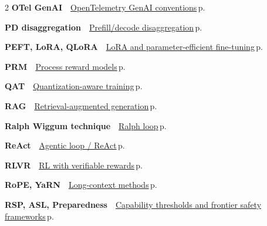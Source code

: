 \documentclass[10pt,a4paper,openany]{report}
\begin{document}
\begin{multicols}{2}
\textbf{\sffamily\color{accent}OTel GenAI}\ \ \hyperref[c:protocols-11]{OpenTelemetry GenAI conventions}\,{\color{muted}\scriptsize p.\,\pageref{c:protocols-11}}\par\vspace{2pt}
\textbf{\sffamily\color{accent}PD disaggregation}\ \ \hyperref[c:inference-3]{Prefill/decode disaggregation}\,{\color{muted}\scriptsize p.\,\pageref{c:inference-3}}\par\vspace{2pt}
\textbf{\sffamily\color{accent}PEFT, LoRA, QLoRA}\ \ \hyperref[c:training-5]{LoRA and parameter-efficient fine-tuning}\,{\color{muted}\scriptsize p.\,\pageref{c:training-5}}\par\vspace{2pt}
\textbf{\sffamily\color{accent}PRM}\ \ \hyperref[c:reasoning-8]{Process reward models}\,{\color{muted}\scriptsize p.\,\pageref{c:reasoning-8}}\par\vspace{2pt}
\textbf{\sffamily\color{accent}QAT}\ \ \hyperref[c:quant-4]{Quantization-aware training}\,{\color{muted}\scriptsize p.\,\pageref{c:quant-4}}\par\vspace{2pt}
\textbf{\sffamily\color{accent}RAG}\ \ \hyperref[c:context-5]{Retrieval-augmented generation}\,{\color{muted}\scriptsize p.\,\pageref{c:context-5}}\par\vspace{2pt}
\textbf{\sffamily\color{accent}Ralph Wiggum technique}\ \ \hyperref[c:coding-4]{Ralph loop}\,{\color{muted}\scriptsize p.\,\pageref{c:coding-4}}\par\vspace{2pt}
\textbf{\sffamily\color{accent}ReAct}\ \ \hyperref[c:agents-3]{Agentic loop / ReAct}\,{\color{muted}\scriptsize p.\,\pageref{c:agents-3}}\par\vspace{2pt}
\textbf{\sffamily\color{accent}RLVR}\ \ \hyperref[c:reasoning-2]{RL with verifiable rewards}\,{\color{muted}\scriptsize p.\,\pageref{c:reasoning-2}}\par\vspace{2pt}
\textbf{\sffamily\color{accent}RoPE, YaRN}\ \ \hyperref[c:arch-7]{Long-context methods}\,{\color{muted}\scriptsize p.\,\pageref{c:arch-7}}\par\vspace{2pt}
\textbf{\sffamily\color{accent}RSP, ASL, Preparedness}\ \ \hyperref[c:safety-0]{Capability thresholds and frontier safety frameworks}\,{\color{muted}\scriptsize p.\,\pageref{c:safety-0}}\par\vspace{2pt}

\end{multicols}
\end{document}
